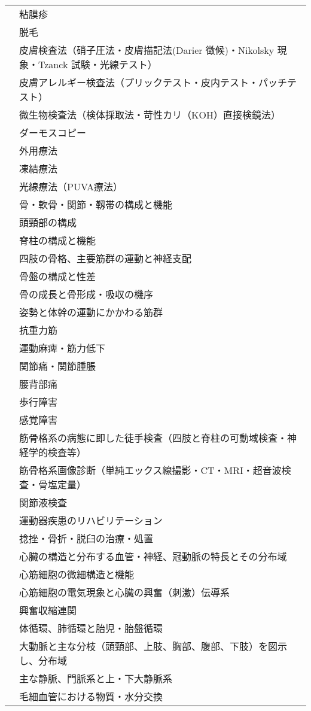 \begin{xltabular}{\linewidth}{XX}
 & 粘膜疹 \\
 & 脱毛 \\
 & 皮膚検査法（硝子圧法・皮膚描記法(Darier 徴候)・Nikolsky 現象・Tzanck 試験・光線テスト） \\
 & 皮膚アレルギー検査法（プリックテスト・皮内テスト・パッチテスト） \\
 & 微生物検査法（検体採取法・苛性カリ（KOH）直接検鏡法） \\
 & ダーモスコピー \\
 & 外用療法 \\
 & 凍結療法 \\
 & 光線療法（PUVA療法） \\
 & 骨・軟骨・関節・靱帯の構成と機能 \\
 & 頭頸部の構成 \\
 & 脊柱の構成と機能 \\
 & 四肢の骨格、主要筋群の運動と神経支配 \\
 & 骨盤の構成と性差 \\
 & 骨の成長と骨形成・吸収の機序 \\
 & 姿勢と体幹の運動にかかわる筋群 \\
 & 抗重力筋 \\
 & 運動麻痺・筋力低下 \\
 & 関節痛・関節腫脹 \\
 & 腰背部痛 \\
 & 歩行障害 \\
 & 感覚障害 \\
 & 筋骨格系の病態に即した徒手検査（四肢と脊柱の可動域検査・神経学的検査等） \\
 & 筋骨格系画像診断（単純エックス線撮影・CT・MRI・超音波検査・骨塩定量） \\
 & 関節液検査 \\
 & 運動器疾患のリハビリテーション \\
 & 捻挫・骨折・脱臼の治療・処置 \\
 & 心臓の構造と分布する血管・神経、冠動脈の特長とその分布域 \\
 & 心筋細胞の微細構造と機能 \\
 & 心筋細胞の電気現象と心臓の興奮（刺激）伝導系 \\
 & 興奮収縮連関 \\
 & 体循環、肺循環と胎児・胎盤循環 \\
 & 大動脈と主な分枝（頭頸部、上肢、胸部、腹部、下肢）を図示し、分布域 \\
 & 主な静脈、門脈系と上・下大静脈系 \\
 & 毛細血管における物質・水分交換 \\

\end{xltabular}
